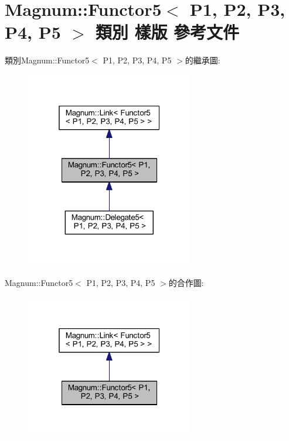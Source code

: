 \hypertarget{class_magnum_1_1_functor5}{}\section{Magnum\+:\+:Functor5$<$ P1, P2, P3, P4, P5 $>$ 類別 樣版 參考文件}
\label{class_magnum_1_1_functor5}


類別\+Magnum\+:\+:Functor5$<$ P1, P2, P3, P4, P5 $>$的繼承圖\+:\nopagebreak
\begin{figure}[H]
\begin{center}
\leavevmode
\includegraphics[width=208pt]{class_magnum_1_1_functor5__inherit__graph}
\end{center}
\end{figure}


Magnum\+:\+:Functor5$<$ P1, P2, P3, P4, P5 $>$的合作圖\+:\nopagebreak
\begin{figure}[H]
\begin{center}
\leavevmode
\includegraphics[width=208pt]{class_magnum_1_1_functor5__coll__graph}
\end{center}
\end{figure}
